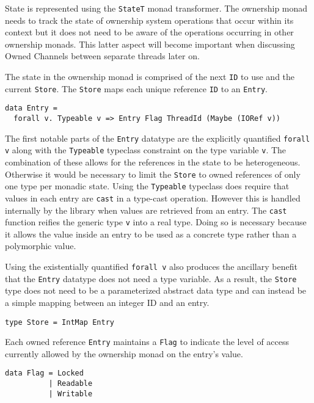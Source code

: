 \documentclass[onehalf,11pt]{beavtex}
\begin{document}

State is represented using the \texttt{StateT} monad transformer.
The ownership monad needs to track the state of ownership system operations
that occur within its context but it does not need to be aware of the
operations occurring in other ownership monads.
This latter aspect will become important when discussing Owned Channels between
separate threads later on.

The state in the ownership monad is comprised of the next \texttt{ID}
to use and the current \texttt{Store}.  The \texttt{Store} maps each unique
reference \texttt{ID} to an \texttt{Entry}.

\begin{verbatim}
data Entry =
  forall v. Typeable v => Entry Flag ThreadId (Maybe (IORef v))
\end{verbatim}

The first notable parts of the \texttt{Entry} datatype are the explicitly
quantified \texttt{forall v} along with the \texttt{Typeable} typeclass
constraint on the type variable \texttt{v}.
The combination of these allows for the references in the state to be
heterogeneous.
Otherwise it would be necessary to limit the \texttt{Store} to owned
references of only one type per monadic state. %
Using the \texttt{Typeable} typeclass does require that values in each entry are
\texttt{cast} in a type-cast operation.  However this is handled internally
by the library when values are retrieved from an entry.
The \texttt{cast} function reifies the generic type \texttt{v} into a real
type.
Doing so is necessary because it allows the value inside an entry to be used
as a concrete type rather than a polymorphic value.

Using the existentially quantified \texttt{forall v} also produces the
ancillary benefit that the \texttt{Entry} datatype does not need a type
variable.
As a result, the \texttt{Store} type does not need to be a parameterized abstract
data type and can instead be a simple mapping between an integer ID and an entry.

\begin{verbatim}
type Store = IntMap Entry
\end{verbatim}

Each owned reference \texttt{Entry} maintains a \texttt{Flag} to indicate the
level of access currently allowed by the ownership monad on the entry's value.

\begin{verbatim}
data Flag = Locked
          | Readable
          | Writable
\end{verbatim}
\end{document}
